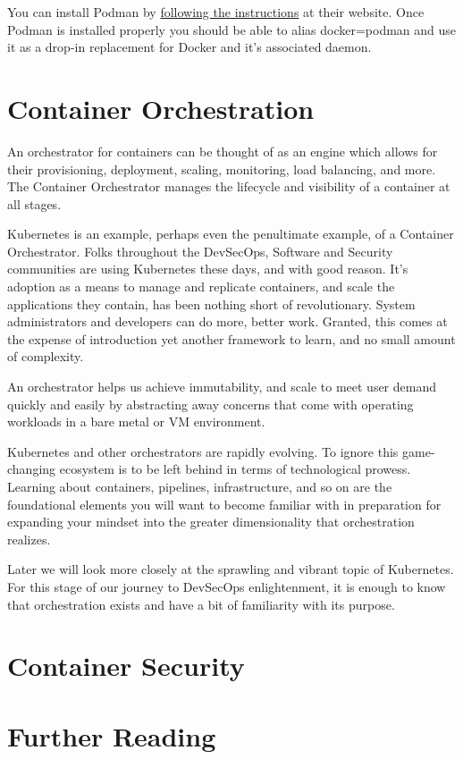 \justify{}
You can install Podman by 
\href{https://podman.io/getting-started/installation.html}{following the instructions}
at their website. Once Podman is installed properly you
should be able to alias docker=podman and use it as a
drop-in replacement for Docker and it's associated daemon.

\section{Container Orchestration}
\justify{}
An orchestrator for containers can be thought of as an engine which
allows for their provisioning, deployment, scaling, monitoring, load
balancing, and more. The Container Orchestrator manages the
lifecycle and visibility of a container at all stages.

\justify{}
Kubernetes is an example, perhaps even the
penultimate example, of a Container Orchestrator.
Folks throughout the DevSecOps, Software and
Security communities are using Kubernetes these days, and
with good reason. It's adoption as a means to manage and
replicate containers, and scale the applications they contain,
has been nothing short of revolutionary. System administrators
and developers can do more, better work. Granted, this comes at
the expense of introduction yet another framework to learn, and
no small amount of complexity.

\justify{}
An orchestrator helps us achieve immutability, and scale
to meet user demand quickly and easily by abstracting away
concerns that come with operating workloads in a bare metal
or VM environment.

\justify{}
Kubernetes and other orchestrators are rapidly evolving. To ignore this
game-changing ecosystem is to be left behind in terms of technological
prowess. Learning about containers, pipelines, infrastructure, and
so on are the foundational elements you will want to become familiar
with in preparation for expanding your mindset into the greater
dimensionality that orchestration realizes.

\justify{}
Later we will look more closely at the sprawling and vibrant 
topic of Kubernetes. For this stage of our journey to DevSecOps
enlightenment, it is enough to know that orchestration exists
and have a bit of familiarity with its purpose.

\section{Container Security} 


\section{Further Reading}
